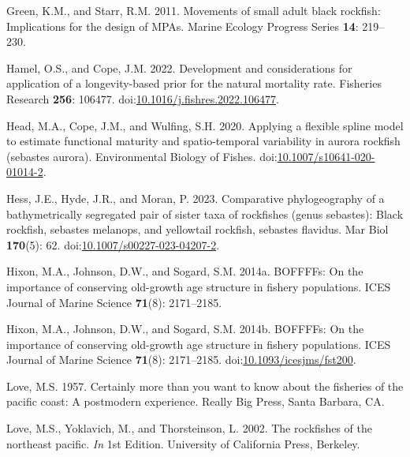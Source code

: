 \documentclass[11pt,
  english,
  letterpaper,
]{article}
\newlength{\cslhangindent}
\newenvironment{CSLReferences}[2] %
 {%
  \setlength{\parindent}{0pt}
  \ifodd #1 \everypar{\setlength{\hangindent}{\cslhangindent}}\ignorespaces\fi
  \ifnum #2 > 0
  \setlength{\parskip}{#2\baselineskip}
  \fi
 }%
 {}
\begin{document}
\begin{CSLReferences}{1}{0}
\leavevmode{}%
Green, K.M., and Starr, R.M. 2011. Movements of small adult black rockfish: Implications for the design of MPAs. Marine Ecology Progress Series \textbf{14}: 219--230.

\leavevmode{}%
Hamel, O.S., and Cope, J.M. 2022. Development and considerations for application of a longevity-based prior for the natural mortality rate. Fisheries Research \textbf{256}: 106477. doi:\href{https://doi.org/10.1016/j.fishres.2022.106477}{10.1016/j.fishres.2022.106477}.

\leavevmode{}%
Head, M.A., Cope, J.M., and Wulfing, S.H. 2020. Applying a flexible spline model to estimate functional maturity and spatio-temporal variability in aurora rockfish (sebastes aurora). Environmental Biology of Fishes. doi:\href{https://doi.org/10.1007/s10641-020-01014-2}{10.1007/s10641-020-01014-2}.

\leavevmode{}%
Hess, J.E., Hyde, J.R., and Moran, P. 2023. Comparative phylogeography of a bathymetrically segregated pair of sister taxa of rockfishes (genus sebastes): Black rockfish, sebastes melanops, and yellowtail rockfish, sebastes flavidus. Mar Biol \textbf{170}(5): 62. doi:\href{https://doi.org/10.1007/s00227-023-04207-2}{10.1007/s00227-023-04207-2}.

\leavevmode{}%
Hixon, M.A., Johnson, D.W., and Sogard, S.M. 2014a. BOFFFFs: On the importance of conserving old-growth age structure in fishery populations. ICES Journal of Marine Science \textbf{71}(8): 2171--2185.

\leavevmode{}%
Hixon, M.A., Johnson, D.W., and Sogard, S.M. 2014b. {BOFFFFs}: On the importance of conserving old-growth age structure in fishery populations. {ICES} Journal of Marine Science \textbf{71}(8): 2171--2185. doi:\href{https://doi.org/10.1093/icesjms/fst200}{10.1093/icesjms/fst200}.

\leavevmode{}%
Love, M.S. 1957. Certainly more than you want to know about the fisheries of the pacific coast: A postmodern experience. Really Big Press, Santa Barbara, CA.

\leavevmode{}%
Love, M.S., Yoklavich, M., and Thorsteinson, L. 2002. The rockfishes of the northeast pacific. \emph{In} 1st Edition. University of California Press, Berkeley.


\end{CSLReferences}
\end{document}
